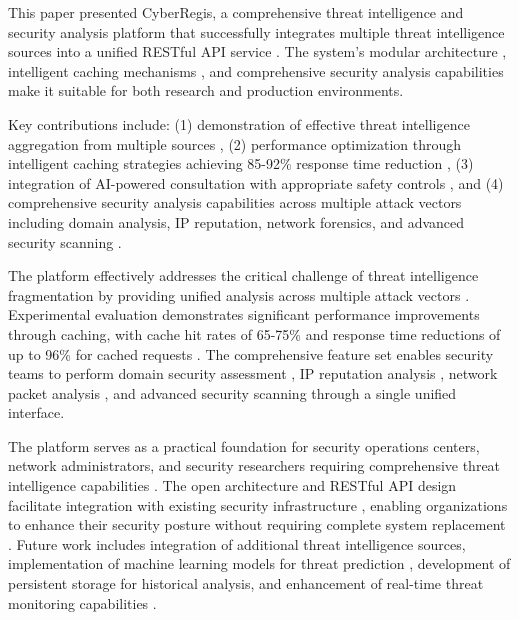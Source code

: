 \documentclass[pdflatex,sn-mathphys-num]{sn-jnl}%
\theoremstyle{thmstyleone}%
\theoremstyle{thmstyletwo}%
\theoremstyle{thmstylethree}%
\begin{document}
This paper presented CyberRegis, a comprehensive threat intelligence and security analysis platform that successfully integrates multiple threat intelligence sources into a unified RESTful API service \cite{bib1}. The system's modular architecture \cite{bib20}, intelligent caching mechanisms \cite{bib18,bib19}, and comprehensive security analysis capabilities make it suitable for both research and production environments.

Key contributions include: (1) demonstration of effective threat intelligence aggregation from multiple sources \cite{bib1,bib10}, (2) performance optimization through intelligent caching strategies achieving 85-92\% response time reduction \cite{bib18}, (3) integration of AI-powered consultation with appropriate safety controls \cite{bib15,bib16}, and (4) comprehensive security analysis capabilities across multiple attack vectors including domain analysis, IP reputation, network forensics, and advanced security scanning \cite{bib5,bib9}.

The platform effectively addresses the critical challenge of threat intelligence fragmentation by providing unified analysis across multiple attack vectors \cite{bib1}. Experimental evaluation demonstrates significant performance improvements through caching, with cache hit rates of 65-75\% and response time reductions of up to 96\% for cached requests \cite{bib18}. The comprehensive feature set enables security teams to perform domain security assessment \cite{bib5,bib9}, IP reputation analysis \cite{bib13}, network packet analysis \cite{bib5}, and advanced security scanning through a single unified interface.

The platform serves as a practical foundation for security operations centers, network administrators, and security researchers requiring comprehensive threat intelligence capabilities \cite{bib1}. The open architecture and RESTful API design facilitate integration with existing security infrastructure \cite{bib7}, enabling organizations to enhance their security posture without requiring complete system replacement \cite{bib9}. Future work includes integration of additional threat intelligence sources, implementation of machine learning models for threat prediction \cite{bib1,bib13}, development of persistent storage for historical analysis, and enhancement of real-time threat monitoring capabilities \cite{bib5,bib15}. 

\backmatter

\end{document}
